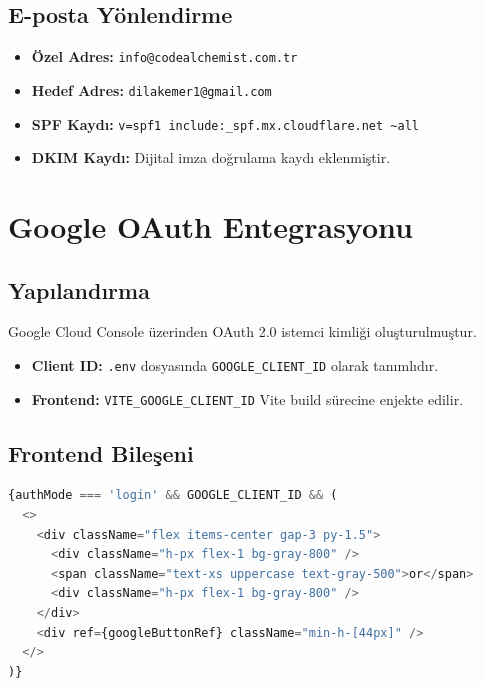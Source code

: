 \documentclass[12pt,a4paper]{article}
\begin{document}
\subsection{E-posta Y\"{o}nlendirme}
\begin{itemize}
  \item \textbf{\"{O}zel Adres:} \texttt{info@codealchemist.com.tr}
  \item \textbf{Hedef Adres:} \texttt{dilakemer1@gmail.com}
  \item \textbf{SPF Kayd{\i}:} \texttt{v=spf1 include:\_spf.mx.cloudflare.net \textasciitilde all}
  \item \textbf{DKIM Kayd{\i}:} Dijital imza do\u{g}rulama kayd{\i} eklenmi\c{s}tir.
\end{itemize}

\section{Google OAuth Entegrasyonu}

\subsection{Yap{\i}land{\i}rma}
Google Cloud Console \"{u}zerinden OAuth 2.0 istemci kimli\u{g}i olu\c{s}turulmu\c{s}tur.
\begin{itemize}
  \item \textbf{Client ID:} \texttt{.env} dosyas{\i}nda \texttt{GOOGLE\_CLIENT\_ID} olarak tan{\i}ml{\i}d{\i}r.
  \item \textbf{Frontend:} \texttt{VITE\_GOOGLE\_CLIENT\_ID} Vite build s\"{u}recine enjekte edilir.
\end{itemize}

\subsection{Frontend Bile\c{s}eni}
\begin{lstlisting}[language=JavaScript, caption={Google buton render mant{\i}\u{g}{\i}}]
{authMode === 'login' && GOOGLE_CLIENT_ID && (
  <>
    <div className="flex items-center gap-3 py-1.5">
      <div className="h-px flex-1 bg-gray-800" />
      <span className="text-xs uppercase text-gray-500">or</span>
      <div className="h-px flex-1 bg-gray-800" />
    </div>
    <div ref={googleButtonRef} className="min-h-[44px]" />
  </>
)}
\end{lstlisting}
\end{document}
